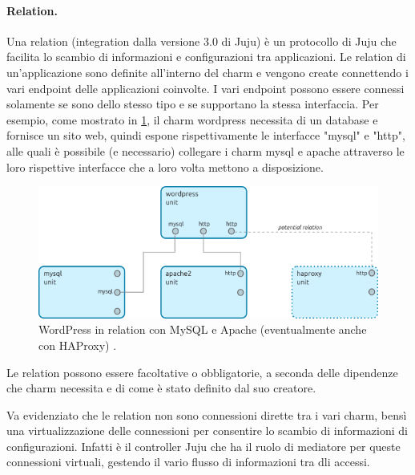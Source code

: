 \paragraph{Relation.}
Una relation \cite{juju_relation} (integration dalla versione 3.0 di Juju) è un protocollo di Juju che facilita lo scambio di informazioni e configurazioni tra applicazioni.
% 
Le relation di un'applicazione sono definite all'interno del charm e vengono create connettendo i vari endpoint delle applicazioni coinvolte.
% 
I vari endpoint possono essere connessi solamente se sono dello stesso tipo e se supportano la stessa interfaccia.
% 
Per esempio, come mostrato in \cref{fig:juju_relations}, il charm wordpress necessita di un database e fornisce un sito web, quindi espone rispettivamente le interfacce "mysql" e "http", alle quali è possibile (e necessario) collegare i charm mysql e apache attraverso le loro rispettive interfacce che a loro volta mettono a disposizione.

\begin{figure}[H]
    \centering
    \includegraphics[width=0.9\linewidth]{tesi/files/immagini/juju/relations}
    \caption{WordPress in relation con MySQL e Apache (eventualmente anche con HAProxy) \cite{juju_relation}.}
    \label{fig:juju_relations}
\end{figure}

\noindent
Le relation possono essere facoltative o obbligatorie, a seconda delle dipendenze che charm necessita e di come è stato definito dal suo creatore.
% 

Va evidenziato che le relation non sono connessioni dirette tra i vari charm, bensì una virtualizzazione delle connessioni per consentire lo scambio di informazioni di configurazioni.
% 
Infatti è il controller Juju che ha il ruolo di mediatore per queste connessioni virtuali, gestendo il vario flusso di informazioni tra dli accessi. 




